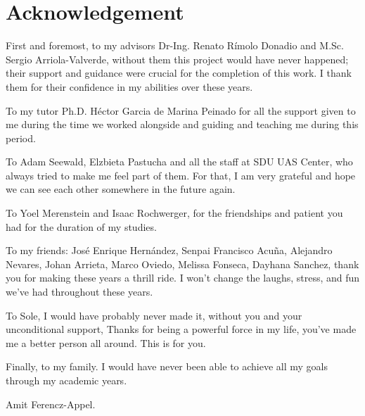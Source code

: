 \section*{Acknowledgement}
First and foremost, to my advisors Dr-Ing. Renato Rímolo Donadio and M.Sc. Sergio Arriola-Valverde, without them this project would have never happened; their support and guidance were crucial for the completion of this work. I thank them for their confidence in my abilities over these years.

To my tutor Ph.D. Héctor Garcia de Marina Peinado for all the support given to me during the time we worked alongside and guiding and teaching me during this period.

To Adam Seewald, Elzbieta Pastucha and all the staff at SDU UAS Center, who always tried to make me feel part of them. For that, I am very grateful and hope we can see each other somewhere in the future again.

To Yoel Merenstein and Isaac Rochwerger, for the friendships and patient you had for the duration of my studies. 

To my friends: José Enrique Hernández, Senpai Francisco Acuña, Alejandro Nevares, Johan Arrieta, Marco Oviedo, Melissa Fonseca, Dayhana Sanchez, thank you for making these years a thrill ride.  I won’t change the laughs, stress, and fun we’ve had throughout these years. 

To Sole, I would have probably never made it, without you and your unconditional support, Thanks for being a powerful force in my life, you’ve made me a better person all around. This is for you.

Finally, to my family. I would have never been able to achieve all my goals through my academic years. 

Amit Ferencz-Appel.